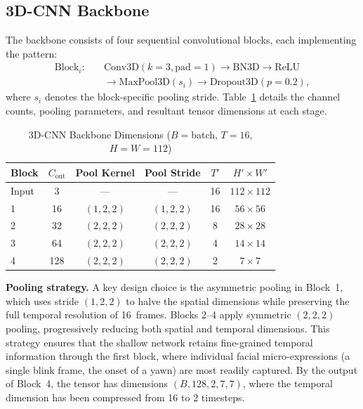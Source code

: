 \documentclass[journal]{IEEEtran}
\begin{document}
\subsection{3D-CNN Backbone}
\label{sec:backbone}

The backbone consists of four sequential convolutional blocks, each implementing the pattern:
\begin{equation}
\begin{aligned}
  \text{Block}_i: \quad &\text{Conv3D}(k{=}3, \text{pad}{=}1) \rightarrow \text{BN3D} \rightarrow \text{ReLU} \\
  &\rightarrow \text{MaxPool3D}(s_i) \rightarrow \text{Dropout3D}(p{=}0.2),
\end{aligned}
\label{eq:block}
\end{equation}
where $s_i$ denotes the block-specific pooling stride. Table~\ref{tab:backbone} details the channel counts, pooling parameters, and resultant tensor dimensions at each stage.

\begin{table}[t]
  \caption{3D-CNN Backbone Dimensions ($B{=}$batch, $T{=}16$, $H{=}W{=}112$)}
  \label{tab:backbone}
  \centering
  \small
  \begin{tabular}{lccccc}
    \toprule
    Block & $C_{\text{out}}$ & Pool Kernel & Pool Stride & $T'$ & $H'{\times}W'$ \\
    \midrule
    Input & 3   & --- & --- & 16 & $112\times112$ \\
    1     & 16  & $(1,2,2)$ & $(1,2,2)$ & 16 & $56\times56$ \\
    2     & 32  & $(2,2,2)$ & $(2,2,2)$ & 8  & $28\times28$ \\
    3     & 64  & $(2,2,2)$ & $(2,2,2)$ & 4  & $14\times14$ \\
    4     & 128 & $(2,2,2)$ & $(2,2,2)$ & 2  & $7\times7$ \\
    \bottomrule
  \end{tabular}
\end{table}

\textbf{Pooling strategy.} A key design choice is the asymmetric pooling in Block~1, which uses stride $(1,2,2)$ to halve the spatial dimensions while preserving the full temporal resolution of 16~frames. Blocks 2--4 apply symmetric $(2,2,2)$ pooling, progressively reducing both spatial and temporal dimensions. This strategy ensures that the shallow network retains fine-grained temporal information through the first block, where individual facial micro-expressions (a single blink frame, the onset of a yawn) are most readily captured. By the output of Block~4, the tensor has dimensions $(B, 128, 2, 7, 7)$, where the temporal dimension has been compressed from 16 to 2 timesteps.
\end{document}
